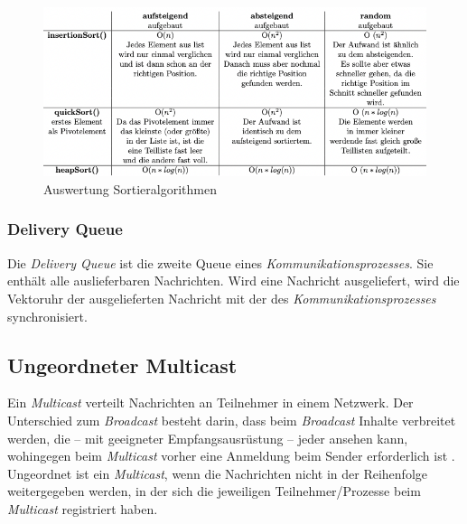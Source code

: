 \begin{figure}[htbp]
\begin{center}
\includegraphics[scale=0.59]{Latex/Bilder/sortAlgo.png}
\caption{\label{fig:sortAlgo} Auswertung Sortieralgorithmen \cite{sortAlgo}} 
\end{center}
\end{figure}

\subsubsection{Delivery Queue}

Die \textit{Delivery Queue} ist die zweite Queue eines \textit{Kommunikationsprozesses}. Sie enthält alle auslieferbaren Nachrichten.
Wird eine Nachricht ausgeliefert, wird die Vektoruhr der ausgelieferten Nachricht mit der des \textit{Kommunikationsprozesses} synchronisiert.

\subsection{Ungeordneter Multicast} \label{unordererMulticast}

Ein \textit{Multicast} verteilt Nachrichten an Teilnehmer in einem Netzwerk. Der Unterschied zum \textit{Broadcast} besteht darin, dass beim \textit{Broadcast} Inhalte verbreitet werden, die – mit geeigneter Empfangsausrüstung – jeder ansehen kann, wohingegen beim \textit{Multicast} vorher eine Anmeldung beim Sender erforderlich ist \cite{wiki:Multicast}.\\
Ungeordnet ist ein \textit{Multicast}, wenn die Nachrichten nicht in der Reihenfolge weitergegeben werden, in der sich die jeweiligen Teilnehmer/Prozesse beim \textit{Multicast} registriert haben.

